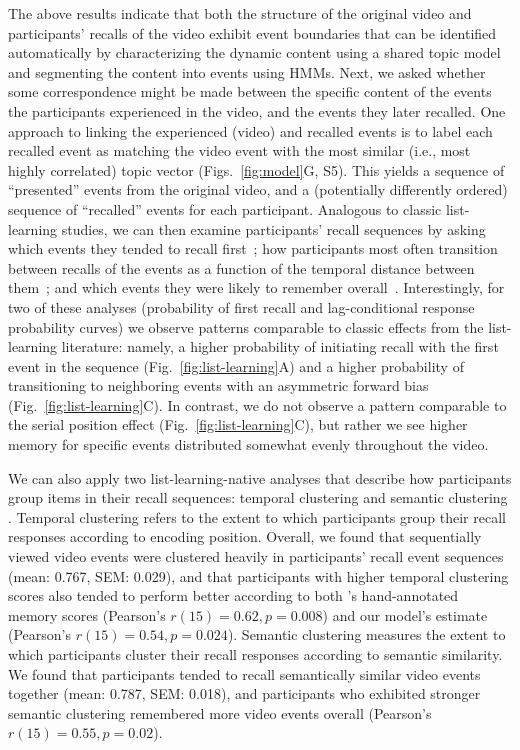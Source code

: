 \documentclass{article}
\newcommand{\matchmats}{S5}
\begin{document}
The above results indicate that both the structure of the original video and participants' recalls of the video exhibit event boundaries that can be identified automatically by characterizing the dynamic content using a shared topic model and segmenting the content into events using HMMs.  Next, we asked whether some correspondence might be made between the specific content of the events the participants experienced in the video, and the events they later recalled.  One approach to linking the experienced (video) and recalled events is to label each recalled event as matching the video event with the most similar (i.e., most highly correlated) topic vector (Figs.~\ref{fig:model}G, \matchmats).  This yields a sequence of ``presented'' events from the original video, and a (potentially differently ordered) sequence of ``recalled'' events for each participant.  Analogous to classic list-learning studies, we can then examine participants' recall sequences by asking which events they tended to recall first~\citep[probability of first recall; Fig.~\ref{fig:list-learning}A;][]{WelcBurn24, PostPhil65, AtkiShif68}; how participants most often transition between recalls of the events as a function of the temporal distance between them~\citep[lag-conditional response probability; Fig.~\ref{fig:list-learning}B;][]{Kaha96}; and which events they were likely to remember overall~\citep[serial position recall analyses; Fig.~\ref{fig:list-learning}C;][]{Murd62a}. Interestingly, for two of these analyses (probability of first recall and lag-conditional response probability curves) we observe patterns comparable to classic effects from the list-learning literature: namely, a higher probability of initiating recall with the first event in the sequence (Fig.~\ref{fig:list-learning}A) and a higher probability of transitioning to neighboring events with an asymmetric forward bias (Fig.~\ref{fig:list-learning}C). In contrast, we do not observe a pattern comparable to the serial position effect (Fig.~\ref{fig:list-learning}C), but rather we see higher memory for specific events distributed somewhat evenly throughout the video.

We can also apply two list-learning-native analyses that describe how participants group items in their recall sequences: temporal clustering and semantic clustering \citep[][see \textit{Methods} for details]{PolyEtal09}.  Temporal clustering refers to the extent to which participants group their recall responses according to encoding position.  Overall, we found that sequentially viewed video events were clustered heavily in participants' recall event sequences (mean: 0.767, SEM: 0.029), and that participants with higher temporal clustering scores also tended to perform better according to both \cite{ChenEtal17}'s hand-annotated memory scores (Pearson's $r(15) = 0.62, p = 0.008$) and our model's estimate (Pearson's $r(15) = 0.54, p = 0.024$).  Semantic clustering measures the extent to which participants cluster their recall responses according to semantic similarity.  We found that participants tended to recall semantically similar video events together (mean: 0.787, SEM: 0.018), and participants who exhibited stronger semantic clustering remembered more video events overall (Pearson's $r(15) = 0.55, p = 0.02$).
\end{document}
